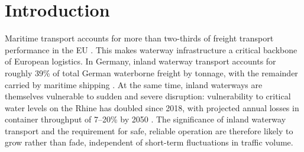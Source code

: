 \chapter{Introduction}
\acresetall %

\label{chap:introduction}

Maritime transport accounts for more than two-thirds of freight transport performance in the EU \parencite{Eurostat2024ModalSplit}. This makes waterway infrastructure a critical backbone of European logistics. In Germany, inland waterway transport accounts for roughly 39\% of total German waterborne freight by tonnage, with the remainder carried by maritime shipping \parencite{Destatis2025GoodsTransport}. 
At the same time, inland waterways are themselves vulnerable to sudden and severe disruption: vulnerability to critical water levels on the Rhine has doubled since 2018, with projected annual losses in container throughput of 7--20\% by 2050 \parencite{Comer2024CriticalWaterLevels}.
The significance of inland waterway transport and the requirement for safe, reliable operation are therefore likely to grow rather than fade, independent of short-term fluctuations in traffic volume.


